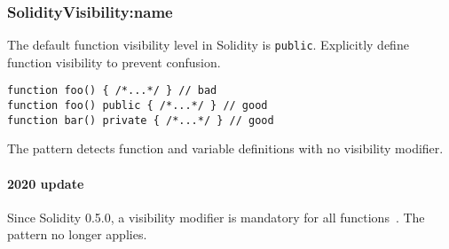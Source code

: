 \subsubsection{\usevalue SolidityVisibility:name } \label{SolidityVisibility}

The default function visibility level in Solidity is \texttt{public}.
Explicitly define function visibility to prevent confusion.
\begin{lstlisting}[language=Solidity]
function foo() { /*...*/ } // bad
function foo() public { /*...*/ } // good
function bar() private { /*...*/ } // good
\end{lstlisting}

The pattern detects function and variable definitions with no visibility modifier.

\paragraph{2020 update}
Since Solidity 0.5.0, a visibility modifier is mandatory for all functions~\cite{Solidity050}.
The pattern no longer applies.

